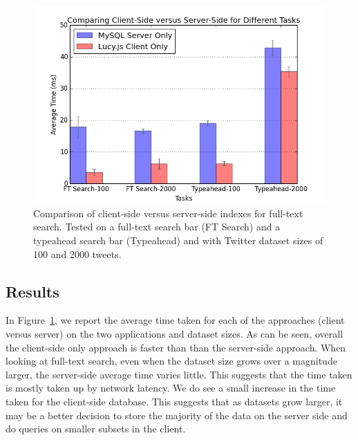 \documentclass{vldb}
\begin{document}
\begin{figure}[h!]
   \includegraphics[scale=.43]{figure_1}
  \caption{Comparison of client-side versus server-side indexes for full-text search. Tested on a full-text search bar (FT Search) and a typeahead search bar (Typeahead) and with Twitter dataset sizes of 100 and 2000 tweets.}
\label{compare}
\end{figure}

\subsection{Results}

In Figure~\ref{compare}, we report the average time taken for each of the approaches (client versus server) on the two applications and dataset sizes. As can be seen, overall the client-side only approach is faster than than the server-side approach. When looking at full-text search, even when the dataset size grows over a magnitude larger, the server-side average time varies little. This suggests that the time taken is mostly taken up by network latency. We do see a small increase in the time taken for the client-side database. This suggests that as datasets grow larger, it may be a better decision to store the majority of the data on the server side and do queries on smaller subsets in the client. 
\end{document}
